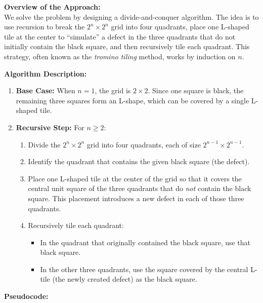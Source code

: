 \documentclass[11pt]{article}
\begin{document}
    \textbf{Overview of the Approach:} \\
    We solve the problem by designing a divide-and-conquer algorithm. The idea is to use recursion to break the \( 2^n \times 2^n \) grid into four quadrants, place one L-shaped tile at the center to “simulate” a defect in the three quadrants that do not initially contain the black square, and then recursively tile each quadrant. This strategy, often known as the \emph{tromino tiling} method, works by induction on \( n \).
    
    \bigskip
    
    \textbf{Algorithm Description:} \\
    \begin{enumerate}
        \item \textbf{Base Case:} When \( n = 1 \), the grid is \( 2 \times 2 \). Since one square is black, the remaining three squares form an L-shape, which can be covered by a single L-shaped tile.
        \item \textbf{Recursive Step:} For \( n \ge 2 \):
        \begin{enumerate}
            \item Divide the \( 2^n \times 2^n \) grid into four quadrants, each of size \( 2^{n-1} \times 2^{n-1} \).
            \item Identify the quadrant that contains the given black square (the defect).
            \item Place one L-shaped tile at the center of the grid so that it covers the central unit square of the three quadrants that do \emph{not} contain the black square. This placement introduces a new defect in each of those three quadrants.
            \item Recursively tile each quadrant:
                \begin{itemize}
                    \item In the quadrant that originally contained the black square, use that black square.
                    \item In the other three quadrants, use the square covered by the central L-tile (the newly created defect) as the black square.
                \end{itemize}
        \end{enumerate}
    \end{enumerate}
    
    \bigskip
    
    \textbf{Pseudocode:}
    
\end{document}
